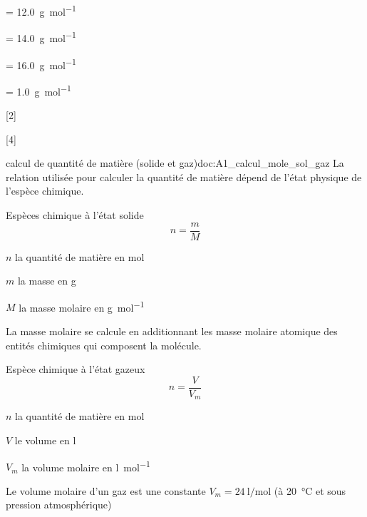 \begin{donnees}[2]
  \item {} = \qty{12,0}{\g\per\mole}
  \item {} = \qty{14,0}{\g\per\mole}
  \item {} = \qty{16,0}{\g\per\mole}
  \item {} = \qty{1,0}{\g\per\mole}
\end{donnees}

[2]

[4]


\begin{doc}{calcul de quantité de matière (solide et gaz)}{doc:A1_calcul_mole_sol_gaz}
  La relation utilisée pour calculer la quantité de matière dépend de l'état physique de l'espèce chimique.
  \begin{multicols}{2}
    Espèces chimique à l'état solide
    \begin{equation*}
      n = \dfrac{m}{M}
    \end{equation*}
    \begin{listePoints}
      \item $n$ la quantité de matière en \unit{\mole}
      \item $m$ la masse en \unit{\g}
      \item $M$ la masse molaire en \unit{\g\per\mole}
    \end{listePoints}
    La masse molaire se calcule en additionnant les masse molaire atomique des entités chimiques qui composent la molécule.
    
    Espèce chimique à l'état gazeux
    \begin{equation*}
      n = \dfrac{V}{V_m}
    \end{equation*}
    \begin{listePoints}
      \item $n$ la quantité de matière en \unit{\mole}
      \item $V$ le volume en \unit{\litre}
      \item $V_m$ la volume molaire en \unit{\litre\per\mole}
    \end{listePoints}
    Le volume molaire d'un gaz est une constante $V_m = \qty{24}{\litre\per\mole}$ (à \qty{20}{\degreeCelsius} et sous pression atmosphérique)
  \end{multicols}
\end{doc}

